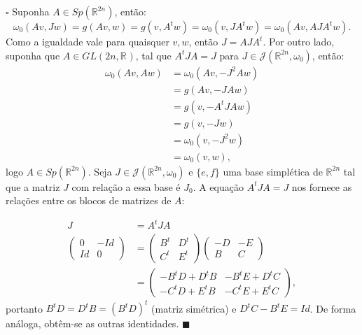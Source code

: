 \documentclass[12pt]{book}
\newenvironment{prova}[1]{$\square$ #1}{\hfill$\blacksquare$}
\newcommand{\estruturacomplexa}{J_{0}}
\newcommand{\estruturascomplexas}[2]{\mathcal{J}(#1, #2)}
\newcommand{\formaSimpleticaabrev}{\omega_{0}}
\newcommand{\generalgroup}[2]{GL(#1, #2)}
\newcommand{\generalgroupreal}[1]{\generalgroup{#1}{\real{}}}
\newcommand{\gruposimpletico}[1]{Sp(#1)}
\newcommand{\real}[1]{\mathbb{R}^{#1}}
\begin{document}
	\begin{prova}
		Suponha $A \in \gruposimpletico{\real{2n}}$, então:
		$$
		\formaSimpleticaabrev(Av, Jw)= g(Av,w) = g(v,A^{t}w) = \formaSimpleticaabrev(v, JA^{t}w) = \formaSimpleticaabrev(Av, AJA^{t}w).
		$$
		Como a igualdade vale para quaisquer $v,w$, então $J = AJA^{t}$. Por outro lado, suponha que $A \in \generalgroupreal{2n}$, tal que $A^{t}JA=J$ para $J \in \estruturascomplexas{\real{2n}}{\formaSimpleticaabrev}$, então:
		$$
		\begin{aligned}
		\formaSimpleticaabrev(Av, Aw) &= \formaSimpleticaabrev(Av, -J^{2}Aw)
		\\
		&=g(Av, -JAw) 
		\\
		&= g(v, -A^{t}JAw) 
		\\
		&= g(v, -Jw) 
		\\
		&= \formaSimpleticaabrev(v, -J^{2}w) 
		\\
		&= \formaSimpleticaabrev(v, w), 
		\end{aligned}
		$$
		logo $A \in \gruposimpletico{\real{2n}}$. Seja $J \in \estruturascomplexas{\real{2n}}{\formaSimpleticaabrev}$ e $\{e, f\}$ uma base simplética de $\real{2n}$ tal que a matriz $J$ com relação a essa base é $\estruturacomplexa$. A equação $A^{t}JA=J$ nos fornece as relações entre os blocos de matrizes de $A$:
		
		$$
		\begin{aligned}
		J &= A^{t}JA
		\\
		\left(
		\begin{array}{cc}
		0 & -Id
		\\
		Id & 0
		\end{array}
		\right)
		&=
		\left(
		\begin{array}{cc}
		B^{t} & D^{t}
		\\
		C^{t} & E^{t}
		\end{array}
		\right)
		\left(
		\begin{array}{cc}
		-D & -E
		\\
		B & C
		\end{array}
		\right)
		\\
		&=
		\left(
		\begin{array}{cc}
		-B^{t}D +D^{t}B & -B^{t}E+D^{t}C
		\\
		-C^{t}D+E^{t}B & -C^{t}E+E^{t}C
		\end{array}
		\right),
		\end{aligned}
		$$
		portanto $B^{t}D = D^{t}B = (B^{t}D)^{t}$ (matriz simétrica) e $D^{t}C-B^{t}E = Id$. De forma análoga, obtêm-se as outras identidades.
	\end{prova}
	
\end{document}
